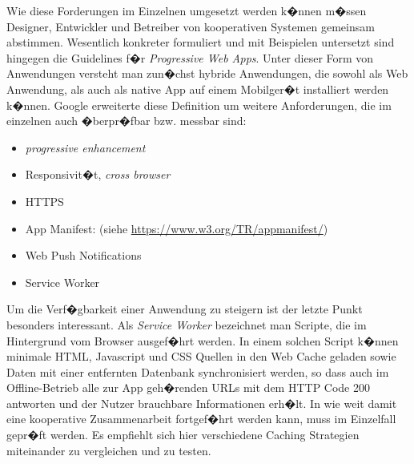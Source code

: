 Wie diese Forderungen im Einzelnen umgesetzt werden k�nnen m�ssen Designer, Entwickler und Betreiber von kooperativen Systemen gemeinsam abstimmen. Wesentlich konkreter formuliert und mit Beispielen untersetzt sind hingegen die Guidelines f�r \textit{Progressive Web Apps}. 
Unter dieser Form von Anwendungen  versteht man zun�chst hybride Anwendungen, die sowohl als Web Anwendung, als auch als native App auf einem Mobilger�t installiert werden k�nnen. Google erweiterte diese Definition um weitere Anforderungen, die im einzelnen auch �berpr�fbar bzw. messbar sind:\vspace{-5pt}
\begin{itemize}
\item \textit{progressive enhancement} %

\item Responsivit�t, \textit{cross browser} %

\item HTTPS

\item App Manifest: (siehe \url{https://www.w3.org/TR/appmanifest/})

\item Web Push Notifications 

\item Service Worker

\end{itemize} 

Um die Verf�gbarkeit einer Anwendung zu steigern ist der letzte Punkt besonders interessant. Als \textit{Service Worker} bezeichnet man Scripte, die im Hintergrund vom Browser ausgef�hrt werden. In einem solchen Script k�nnen minimale HTML, Javascript und CSS Quellen in den Web Cache geladen sowie Daten mit einer entfernten Datenbank synchronisiert werden, so dass auch im Offline-Betrieb alle zur App geh�renden URLs mit dem HTTP Code 200 antworten und der Nutzer brauchbare Informationen erh�lt. In wie weit damit eine kooperative Zusammenarbeit fortgef�hrt werden kann, muss im Einzelfall gepr�ft werden. Es empfiehlt sich hier verschiedene Caching Strategien miteinander zu vergleichen und zu testen.


